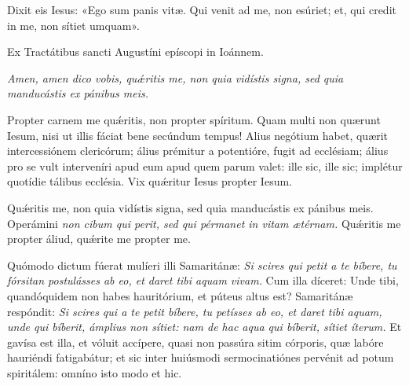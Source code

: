 {\noindent Dixit eis Iesus: «Ego sum panis vitæ. Qui venit ad me, non esúriet; et, qui credit in me, non sítiet umquam».


\noindent Ex Tractátibus sancti Augustíni epíscopi in Ioánnem.

\noindent \emph{Amen, amen dico vobis, quǽritis me, non quia vidístis signa, sed quia manducástis ex pánibus meis.}

\noindent Propter carnem me quǽritis, non propter spíritum. Quam multi non quærunt Iesum, nisi ut illis fáciat bene secúndum tempus! Alius negótium habet, quærit intercessiónem clericórum; álius prémitur a potentióre, fugit ad ecclésiam; álius pro se vult interveníri apud eum apud quem parum valet: ille sic, ille sic; implétur quotídie tálibus ecclésia. Vix quǽritur Iesus propter Iesum.

\noindent Quǽritis me, non quia vidístis signa, sed quia manducástis ex pánibus meis. Operámini \emph{non cibum qui perit, sed qui pérmanet in vitam ætérnam.} Quǽritis me propter áliud, quǽrite me propter me.

\noindent Quómodo dictum fúerat mulíeri illi Samaritánæ: \emph{Si scires qui petit a te bíbere, tu fórsitan postulásses ab eo, et daret tibi aquam vivam.} Cum illa díceret: Unde tibi, quandóquidem non habes hauritórium, et púteus altus est? Samaritánæ respóndit: \emph{Si scires qui a te petit bíbere, tu petísses ab eo, et daret tibi aquam, unde qui bíberit, ámplius non sítiet: nam de hac aqua qui bíberit, sítiet íterum.} Et gavísa est illa, et vóluit accípere, quasi non passúra sitim córporis, quæ labóre hauriéndi fatigabátur; et sic inter huiúsmodi sermocinatiónes pervénit ad potum spiritálem: omníno isto modo et hic.

\vfill
\pagebreak

 

\vspace{-5mm}


\vfill
\pagebreak
}
\newcommand{\benedictus}{\pars{Canticum Zachariæ.} \scriptura{Io. 6, 27}

\vspace{-4mm}

\antiphona{VIII G}{temporalia/ant-operamininoncibum.gtex}

\vspace{-2mm}

\scriptura{Lc. 1, 68-79}

\vspace{-2mm}

\cantusSineNeumas
\initiumpsalmi{temporalia/benedictus-initium-viiisoll-G-auto.gtex}


 \Abardot{}}


